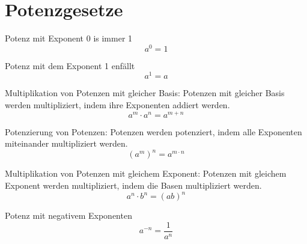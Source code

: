 \documentclass[11pt]{article}
\begin{document}
\section{Potenzgesetze}


Potenz mit Exponent 0 is immer 1
$$ a^{0} = 1 $$

Potenz mit dem Exponent 1 enfällt
$$ a^{1} = a $$ 

Multiplikation von Potenzen mit gleicher Basis: Potenzen mit gleicher Basis werden multipliziert, indem ihre Exponenten addiert werden.
$$ a^{m} \cdot a^{n} = a^{m+n} $$

Potenzierung von Potenzen: Potenzen werden potenziert, indem alle Exponenten miteinander multipliziert werden.
$$ (a^{m})^{n} = a^{m \cdot n} $$

Multiplikation von Potenzen mit gleichem Exponent: Potenzen mit gleichem Exponent werden multipliziert, indem die Basen multipliziert werden.
$$ a^{n} \cdot b^{n} = (ab)^{n} $$

Potenz mit negativem Exponenten
$$ a^{-n} = \frac{1}{a^{n}}$$
\end{document}

